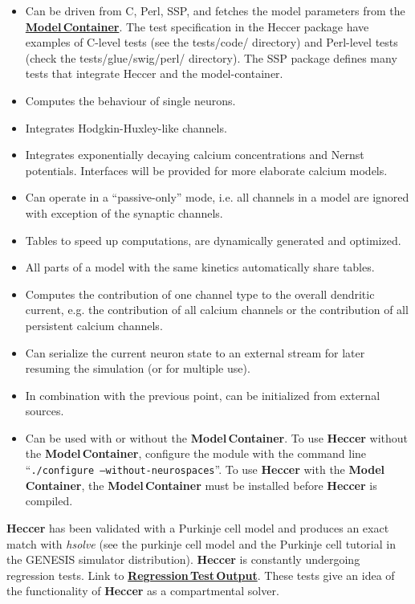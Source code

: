 \documentclass[12pt]{article}
\begin{document}
\begin{itemize}

\item Can be driven from C, Perl, SSP, and fetches the model
  parameters from the
  \href{../model-container/model-container.tex}{\bf Model\,Container}.
  The test specification in the Heccer package have examples of
  C-level tests (see the tests/code/ directory) and Perl-level tests
  (check the tests/glue/swig/perl/ directory).  The SSP package
  defines many tests that integrate Heccer and the model-container.
\item Computes the behaviour of single neurons.
\item Integrates Hodgkin-Huxley-like channels.
\item Integrates exponentially decaying calcium concentrations and Nernst potentials. Interfaces will be provided for more elaborate calcium models.
\item Can operate in a ``passive-only'' mode, i.e. all channels in a model are ignored with exception of the synaptic channels.
\item Tables to speed up computations, are dynamically generated and optimized.
\item All parts of a model with the same kinetics automatically share tables.
\item Computes the contribution of one channel type to the overall dendritic current, e.g. the contribution of all calcium channels or the contribution of all persistent calcium channels.
\item Can serialize the current neuron state to an external stream for later resuming the simulation (or for multiple use).
\item In combination with the previous point, can be initialized from external sources.
\item Can be used with or without the {\bf Model\,Container}. To use {\bf Heccer} without the {\bf Model\,Container}, configure the module with the command line ``{\tt ./configure --without-neurospaces}''. To use {\bf Heccer} with the {\bf Model\,Container}, the {\bf Model\,Container} must be installed before {\bf Heccer} is compiled. 
\end{itemize}
{\bf Heccer} has been validated with a Purkinje cell model and produces an exact match with {\it hsolve} (see the purkinje cell model and the Purkinje cell tutorial in the GENESIS simulator distribution). {\bf Heccer} is constantly undergoing regression tests. Link to  \href{http://neurospaces.sourceforge.net/neurospaces_project/heccer/tests/html/index.html}{\bf Regression\,Test\,Output}. These tests give an idea of the functionality of {\bf Heccer} as a compartmental solver.
\end{document}
